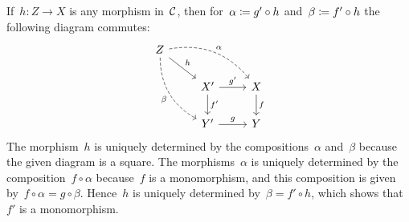 \section{}


If~$h \colon Z \to X$ is any morphism in~$\mathcal{C}$, then for~$\alpha \coloneqq g' \circ h$ and~$\beta \coloneqq f' \circ h$ the following diagram commutes:
\[
  \begin{tikzcd}
      Z
      \arrow[dashed,bend left]{drr}[above right]{\alpha}
      \arrow{dr}[above right]{h}
      \arrow[dashed,bend right]{ddr}[below left]{\beta}
    & {}
    & {}
    \\
      {}
    & X'
      \arrow{r}[above]{g'}
      \arrow{d}[right]{f'}
    & X
      \arrow{d}[right]{f}
    \\
      {}
    & Y'
      \arrow{r}[above]{g}
    & Y
  \end{tikzcd}
\]
The morphism~$h$ is uniquely determined by the compositions~$\alpha$ and~$\beta$ because the given diagram is a {\pb} square.
The morphisms~$\alpha$ is uniquely determined by the composition~$f \circ \alpha$ because~$f$ is a monomorphism, and this composition is given by~$f \circ \alpha = g \circ \beta$.
Hence~$h$ is uniquely determined by~$\beta = f' \circ h$, which shows that~$f'$ is a monomorphism.


